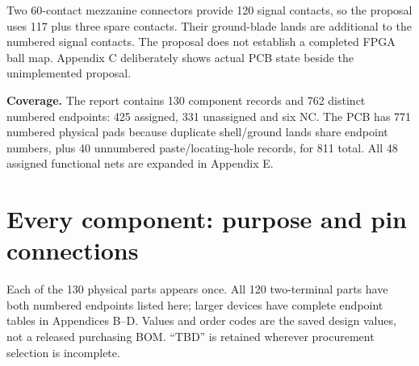 \documentclass[11pt,a4paper]{article}
\begin{document}
Two 60-contact mezzanine connectors provide 120 signal contacts, so the proposal uses 117 plus three spare contacts. Their ground-blade lands are additional to the numbered signal contacts. The proposal does not establish a completed FPGA ball map. Appendix C deliberately shows actual PCB state beside the unimplemented proposal.

\textbf{Coverage.} The report contains 130 component records and 762 distinct numbered endpoints: 425 assigned, 331 unassigned and six NC. The PCB has 771 numbered physical pads because duplicate shell/ground lands share endpoint numbers, plus 40 unnumbered paste/locating-hole records, for 811 total. All 48 assigned functional nets are expanded in Appendix E.
\clearpage\appendix\section{Every component: purpose and pin connections}
Each of the 130 physical parts appears once. All 120 two-terminal parts have both numbered endpoints listed here; larger devices have complete endpoint tables in Appendices B--D. Values and order codes are the saved design values, not a released purchasing BOM. ``TBD'' is retained wherever procurement selection is incomplete.
\end{document}
